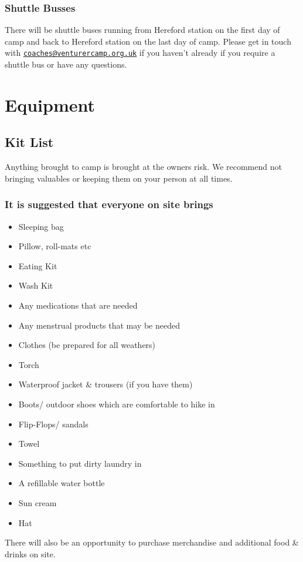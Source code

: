 \documentclass[a4paper, 11pt]{report}
\begin{document}
\subsection{Shuttle Busses}
There will be shuttle buses running from Hereford station on the first day of camp and back to Hereford station on the last day of camp. Please get in touch with \href{mailto:coaches@venturercamp.org.uk}{\texttt{coaches@venturercamp.org.uk}} if you haven't already if you require a shuttle bus or have any questions. 

\chapter{Equipment}
\section{Kit List}
Anything brought to camp is brought at the owners risk. We recommend not bringing valuables or keeping them on your person at all times.
\subsection{It is suggested that everyone on site brings}
\begin{itemize}
    \item Sleeping bag
    \item Pillow, roll-mats etc
    \item Eating Kit
    \item Wash Kit
    \item Any medications that are needed
    \item Any menstrual products that may be needed
    \item Clothes (be prepared for all weathers)
    \item Torch
    \item Waterproof jacket \& trousers (if you have them)
    \item Boots/ outdoor shoes which are comfortable to hike in
    \item Flip-Flops/ sandals
    \item Towel
    \item Something to put dirty laundry in
    \item A refillable water bottle
    \item Sun cream
    \item Hat
\end{itemize}
There will also be an opportunity to purchase merchandise and additional food \& drinks on site. 
\end{document}
